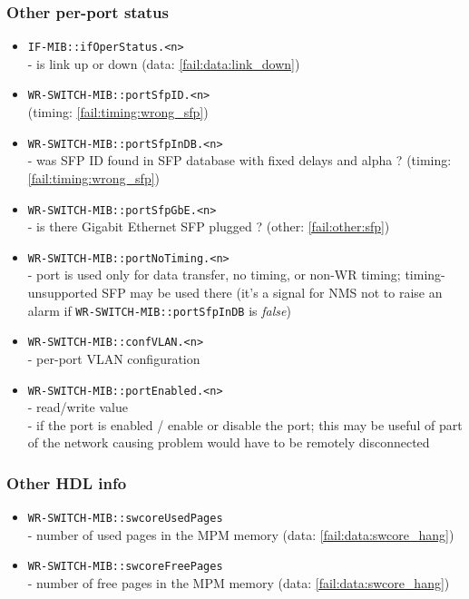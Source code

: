 \subsubsection{Other per-port status}
\begin{itemize}[leftmargin=0pt]
	\item [] \texttt{IF-MIB::ifOperStatus.<n>}\\ - is link up or down (data:
		\ref{fail:data:link_down})
	\item [] \texttt{WR-SWITCH-MIB::portSfpID.<n>}\\ (timing:
		\ref{fail:timing:wrong_sfp})
	\item [] \texttt{WR-SWITCH-MIB::portSfpInDB.<n>}\\ - was SFP ID found in SFP
		database with fixed delays and alpha ? (timing: \ref{fail:timing:wrong_sfp})
	\item [] \texttt{WR-SWITCH-MIB::portSfpGbE.<n>}\\ - is there Gigabit Ethernet
		SFP plugged ? (other: \ref{fail:other:sfp})
	\item [] \texttt{WR-SWITCH-MIB::portNoTiming.<n>}\\ - port is used only for data
		transfer, no timing, or non-WR timing; timing-unsupported SFP may be used
		there (it's a signal for NMS not to raise an alarm if
		\texttt{WR-SWITCH-MIB::portSfpInDB} is \emph{false})
	\item [] \texttt{WR-SWITCH-MIB::confVLAN.<n>}\\ - per-port VLAN configuration
	\item [] \texttt{WR-SWITCH-MIB::portEnabled.<n>}\\
		- read/write value\\
		- if the port is enabled / enable or disable the port; this may be useful of
		part of the network causing problem would have to be remotely disconnected
\end{itemize}

\subsubsection{Other HDL info}
\begin{itemize}[leftmargin=0pt]
	\item [] \texttt{WR-SWITCH-MIB::swcoreUsedPages}\\ - number of used pages in
		the MPM memory (data: \ref{fail:data:swcore_hang})
	\item [] \texttt{WR-SWITCH-MIB::swcoreFreePages}\\ - number of free pages in
		the MPM memory (data: \ref{fail:data:swcore_hang})
\end{itemize}

